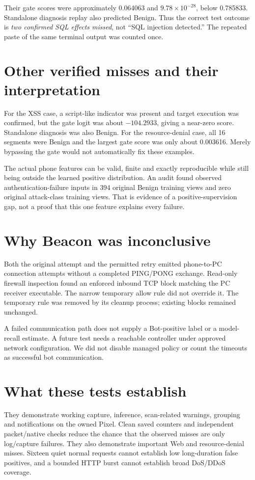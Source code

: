 \documentclass[11pt,a4paper,oneside]{report}
\begin{document}
Their gate scores were approximately 0.064063 and $9.78\times10^{-28}$, below 0.785833. Standalone diagnosis replay also predicted Benign. Thus the correct test outcome is \emph{two confirmed SQL effects missed}, not ``SQL injection detected.'' The repeated paste of the same terminal output was counted once.

\section{Other verified misses and their interpretation}
For the XSS case, a script-like indicator was present and target execution was confirmed, but the gate logit was about $-104.2933$, giving a near-zero score. Standalone diagnosis was also Benign. For the resource-denial case, all 16 segments were Benign and the largest gate score was only about 0.003616. Merely bypassing the gate would not automatically fix these examples.

The actual phone features can be valid, finite and exactly reproducible while still being outside the learned positive distribution. An audit found observed authentication-failure inputs in 394 original Benign training views and zero original attack-class training views. That is evidence of a positive-supervision gap, not a proof that this one feature explains every failure.

\section{Why Beacon was inconclusive}
Both the original attempt and the permitted retry emitted phone-to-PC connection attempts without a completed PING/PONG exchange. Read-only firewall inspection found an enforced inbound TCP block matching the PC receiver executable. The narrow temporary allow rule did not override it. The temporary rule was removed by its cleanup process; existing blocks remained unchanged.

A failed communication path does not supply a Bot-positive label or a model-recall estimate. A future test needs a reachable controller under approved network configuration. We did not disable managed policy or count the timeouts as successful bot communication.

\section{What these tests establish}
They demonstrate working capture, inference, scan-related warnings, grouping and notifications on the owned Pixel. Clean saved counters and independent packet/native checks reduce the chance that the observed misses are only log/capture failures. They also demonstrate important Web and resource-denial misses. Sixteen quiet normal requests cannot establish low long-duration false positives, and a bounded HTTP burst cannot establish broad DoS/DDoS coverage.
\end{document}
